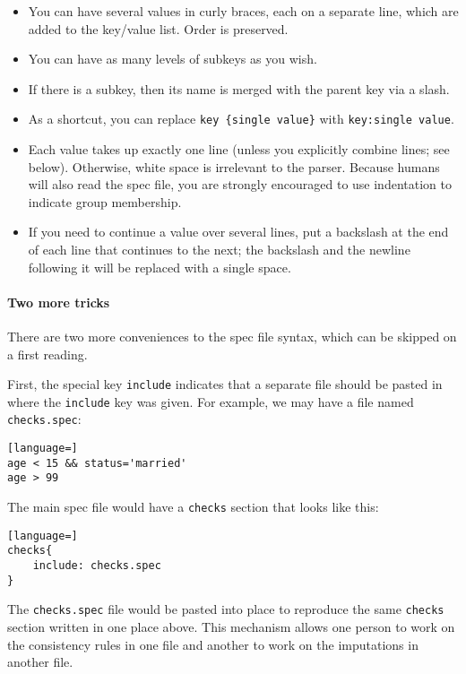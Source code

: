 \documentclass{article}
\begin{document}
\begin{itemize}
\item You can have several values in curly braces, each on a separate line, which are
added to the key/value list. Order is preserved.

\item You can have as many levels of subkeys as you wish.

\item If there is a subkey, then its name is merged with the parent key via a slash.

\item As a shortcut, you can replace {\tt key \{single value\}} with {\tt key:single
value}.

\item Each value takes up exactly one line (unless you explicitly combine lines; see
below). Otherwise, white space is irrelevant to the parser. Because humans will also
read the spec file, you are strongly encouraged to use indentation to indicate group
membership.

\item If you need to continue a value over several lines, put a backslash at the end
of each line that continues to the next; the backslash and the newline following it
will be replaced with a single space.

\end{itemize}

\paragraph{Two more tricks} There are two more conveniences to the spec file syntax,
which can be skipped on a first reading.

First, the special key {\tt include} indicates that a separate file should be pasted in
where the {\tt include} key was given. For example, we may have a file named {\tt
checks.spec}:

\begin{lstlisting}[language=]
age < 15 && status='married'
age > 99
\end{lstlisting}

The main spec file would have a {\tt checks} section that looks like this:

\begin{lstlisting}[language=]
checks{
    include: checks.spec
}
\end{lstlisting}

The {\tt checks.spec} file would be pasted into place to reproduce the same {\tt checks}
section written in one place above. This mechanism allows one person to work on the
consistency rules in one file and another to work on the imputations in another file.
\end{document}
